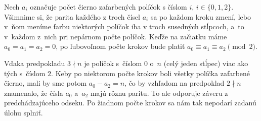 {Nech $a_i$ označuje počet čierno zafarbených políčok s číslom $i$,
$i\in\{0, 1,2\}$. Všimnime si, že parita každého z troch čísel
$a_i$ sa po každom kroku zmení, lebo v~ňom meníme farbu
niektorých políčok iba v troch susedných stĺpcoch,
a~to v~každom z~nich pri nepárnom počte políčok.
Keďže na začiatku máme $a_0=a_1=a_2=0$, po ľubovoľnom počte
krokov bude platiť $a_0 \equiv a_1 \equiv a_2 \pmod 2$.

Vďaka predpokladu $3\nmid n$ je políčok s~číslom 0 o~$n$
(celý jeden stĺpec) viac ako tých s~číslom $2$.
Keby po niektorom počte krokov
boli všetky políčka zafarbené čierno, mali by sme potom $a_0-a_2=n$,
čo by vzhľadom na predpoklad $2\nmid n$ znamenalo, že čísla
$a_0$ a~$a_2$ majú rôznu paritu. To ale odporuje záveru
z predchádzajúceho odseku. Po žiadnom počte krokov sa nám tak
nepodarí zadanú úlohu splniť.
}

